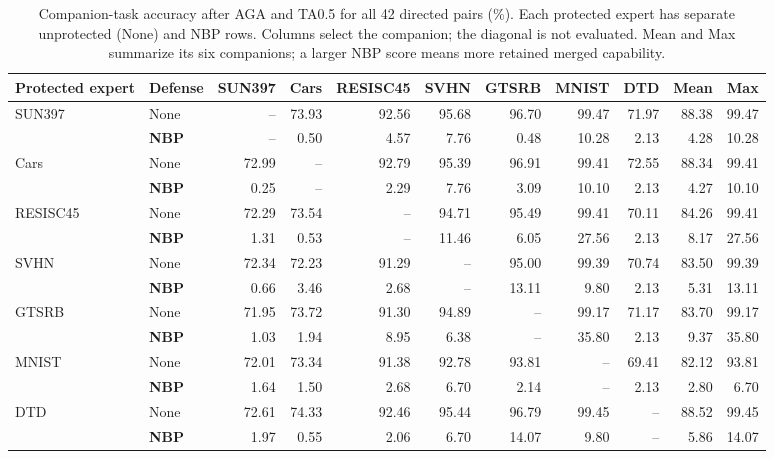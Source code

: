 \begin{table}[!t]
\centering
\small
\setlength{\tabcolsep}{3pt}
\caption{Companion-task accuracy after AGA and TA0.5 for all 42 directed pairs (\%). Each protected expert has separate unprotected (None) and NBP rows. Columns select the companion; the diagonal is not evaluated. Mean and Max summarize its six companions; a larger NBP score means more retained merged capability.}
\label{tab:pair-companion}
\begin{tabular}{llrrrrrrrrr}
\toprule
Protected expert & Defense & SUN397 & Cars & RESISC45 & SVHN & GTSRB & MNIST & DTD & Mean & Max \\
\midrule
\multirow{2}{*}{SUN397} & None & -- & 73.93 & 92.56 & 95.68 & 96.70 & 99.47 & 71.97 & 88.38 & 99.47 \\
 & \textbf{NBP} & -- & 0.50 & 4.57 & 7.76 & 0.48 & 10.28 & 2.13 & 4.28 & 10.28 \\
\midrule
\multirow{2}{*}{Cars} & None & 72.99 & -- & 92.79 & 95.39 & 96.91 & 99.41 & 72.55 & 88.34 & 99.41 \\
 & \textbf{NBP} & 0.25 & -- & 2.29 & 7.76 & 3.09 & 10.10 & 2.13 & 4.27 & 10.10 \\
\midrule
\multirow{2}{*}{RESISC45} & None & 72.29 & 73.54 & -- & 94.71 & 95.49 & 99.41 & 70.11 & 84.26 & 99.41 \\
 & \textbf{NBP} & 1.31 & 0.53 & -- & 11.46 & 6.05 & 27.56 & 2.13 & 8.17 & 27.56 \\
\midrule
\multirow{2}{*}{SVHN} & None & 72.34 & 72.23 & 91.29 & -- & 95.00 & 99.39 & 70.74 & 83.50 & 99.39 \\
 & \textbf{NBP} & 0.66 & 3.46 & 2.68 & -- & 13.11 & 9.80 & 2.13 & 5.31 & 13.11 \\
\midrule
\multirow{2}{*}{GTSRB} & None & 71.95 & 73.72 & 91.30 & 94.89 & -- & 99.17 & 71.17 & 83.70 & 99.17 \\
 & \textbf{NBP} & 1.03 & 1.94 & 8.95 & 6.38 & -- & 35.80 & 2.13 & 9.37 & 35.80 \\
\midrule
\multirow{2}{*}{MNIST} & None & 72.01 & 73.34 & 91.38 & 92.78 & 93.81 & -- & 69.41 & 82.12 & 93.81 \\
 & \textbf{NBP} & 1.64 & 1.50 & 2.68 & 6.70 & 2.14 & -- & 2.13 & 2.80 & 6.70 \\
\midrule
\multirow{2}{*}{DTD} & None & 72.61 & 74.33 & 92.46 & 95.44 & 96.79 & 99.45 & -- & 88.52 & 99.45 \\
 & \textbf{NBP} & 1.97 & 0.55 & 2.06 & 6.70 & 14.07 & 9.80 & -- & 5.86 & 14.07 \\
\bottomrule
\end{tabular}
\end{table}
